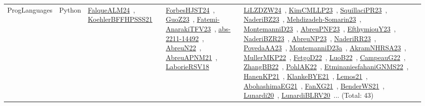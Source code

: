 {\begin{longtable}{lp{3cm}>{\raggedright\arraybackslash}p{6cm}>{\raggedright\arraybackslash}p{6cm}>{\raggedright\arraybackslash}p{8cm}}
ProgLanguages & Python & \href{../works/FalqueALM24.pdf}{FalqueALM24}~\cite{FalqueALM24}, \href{../works/KoehlerBFFHPSSS21.pdf}{KoehlerBFFHPSSS21}~\cite{KoehlerBFFHPSSS21} & \href{../works/ForbesHJST24.pdf}{ForbesHJST24}~\cite{ForbesHJST24}, \href{../works/GuoZ23.pdf}{GuoZ23}~\cite{GuoZ23}, \href{../works/Fatemi-AnarakiTFV23.pdf}{Fatemi-AnarakiTFV23}~\cite{Fatemi-AnarakiTFV23}, \href{../works/abs-2211-14492.pdf}{abs-2211-14492}~\cite{abs-2211-14492}, \href{../works/AbreuN22.pdf}{AbreuN22}~\cite{AbreuN22}, \href{../works/AbreuAPNM21.pdf}{AbreuAPNM21}~\cite{AbreuAPNM21}, \href{../works/LaborieRSV18.pdf}{LaborieRSV18}~\cite{LaborieRSV18} & \href{../works/LiLZDZW24.pdf}{LiLZDZW24}~\cite{LiLZDZW24}, \href{../works/KimCMLLP23.pdf}{KimCMLLP23}~\cite{KimCMLLP23}, \href{../works/SquillaciPR23.pdf}{SquillaciPR23}~\cite{SquillaciPR23}, \href{../works/NaderiBZ23.pdf}{NaderiBZ23}~\cite{NaderiBZ23}, \href{../works/Mehdizadeh-Somarin23.pdf}{Mehdizadeh-Somarin23}~\cite{Mehdizadeh-Somarin23}, \href{../works/MontemanniD23.pdf}{MontemanniD23}~\cite{MontemanniD23}, \href{../works/AbreuPNF23.pdf}{AbreuPNF23}~\cite{AbreuPNF23}, \href{../works/EfthymiouY23.pdf}{EfthymiouY23}~\cite{EfthymiouY23}, \href{../works/NaderiBZR23.pdf}{NaderiBZR23}~\cite{NaderiBZR23}, \href{../works/AbreuNP23.pdf}{AbreuNP23}~\cite{AbreuNP23}, \href{../works/NaderiRR23.pdf}{NaderiRR23}~\cite{NaderiRR23}, \href{../works/PovedaAA23.pdf}{PovedaAA23}~\cite{PovedaAA23}, \href{../works/MontemanniD23a.pdf}{MontemanniD23a}~\cite{MontemanniD23a}, \href{../works/AkramNHRSA23.pdf}{AkramNHRSA23}~\cite{AkramNHRSA23}, \href{../works/MullerMKP22.pdf}{MullerMKP22}~\cite{MullerMKP22}, \href{../works/FetgoD22.pdf}{FetgoD22}~\cite{FetgoD22}, \href{../works/LuoB22.pdf}{LuoB22}~\cite{LuoB22}, \href{../works/CampeauG22.pdf}{CampeauG22}~\cite{CampeauG22}, \href{../works/ZhangBB22.pdf}{ZhangBB22}~\cite{ZhangBB22}, \href{../works/PohlAK22.pdf}{PohlAK22}~\cite{PohlAK22}, \href{../works/EtminaniesfahaniGNMS22.pdf}{EtminaniesfahaniGNMS22}~\cite{EtminaniesfahaniGNMS22}, \href{../works/HanenKP21.pdf}{HanenKP21}~\cite{HanenKP21}, \href{../works/KlankeBYE21.pdf}{KlankeBYE21}~\cite{KlankeBYE21}, \href{../works/Lemos21.pdf}{Lemos21}~\cite{Lemos21}, \href{../works/AbohashimaEG21.pdf}{AbohashimaEG21}~\cite{AbohashimaEG21}, \href{../works/FanXG21.pdf}{FanXG21}~\cite{FanXG21}, \href{../works/BenderWS21.pdf}{BenderWS21}~\cite{BenderWS21}, \href{../works/Lunardi20.pdf}{Lunardi20}~\cite{Lunardi20}, \href{../works/LunardiBLRV20.pdf}{LunardiBLRV20}~\cite{LunardiBLRV20}... (Total: 43)\\
\end{longtable}
}

